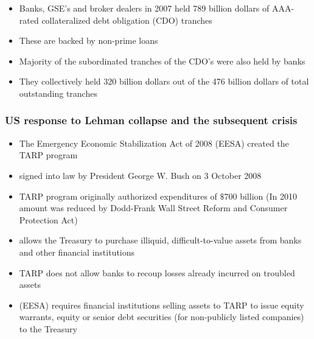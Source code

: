 \documentclass[11pt]{beamer}
\begin{document}
\begin{frame}
\begin{itemize}\itemsep10pt
\item Banks, GSE's and broker dealers in 2007 held 789 billion dollars of AAA-rated collateralized debt obligation (CDO) tranches
\item These are backed by non-prime loans
\item Majority of the subordinated tranches of the CDO's were also held by banks
\item They collectively held 320 billion dollars out of the 476 billion dollars of total outstanding tranches
\end{itemize}
\end{frame}

\begin{frame}
\frametitle{US response to Lehman collapse and the subsequent crisis}
\hfill \break
\begin{itemize}
\item The Emergency Economic Stabilization Act of 2008 (EESA) created the TARP program
\item signed into law by President George W. Bush on 3 October 2008
\item TARP program originally authorized expenditures of $\$$700 billion (In 2010 amount was reduced by Dodd-Frank Wall Street Reform and Consumer Protection Act)
\item allows the Treasury to purchase illiquid, difficult-to-value assets from banks and other financial institutions
\item TARP does not allow banks to recoup losses already incurred on troubled assets
\item (EESA) requires financial institutions selling assets to TARP to issue equity warrants, equity or senior debt securities (for non-publicly listed companies) to the Treasury
\end{itemize}
\end{frame}
\end{document}
